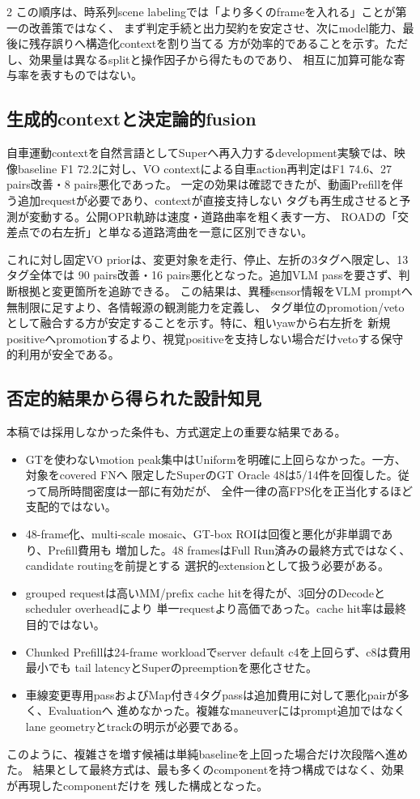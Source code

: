 \documentclass[9pt,a4paper]{extarticle}
\begin{document}
\begin{multicols}{2}
この順序は、時系列scene labelingでは「より多くのframeを入れる」ことが第一の改善策ではなく、
まず判定手続と出力契約を安定させ、次にmodel能力、最後に残存誤りへ構造化contextを割り当てる
方が効率的であることを示す。ただし、効果量は異なるsplitと操作因子から得たものであり、
相互に加算可能な寄与率を表すものではない。

\subsection{生成的contextと決定論的fusion}
自車運動contextを自然言語としてSuperへ再入力するdevelopment実験では、映像baseline
F1 72.2に対し、VO contextによる自車action再判定はF1 74.6、27 pairs改善・8 pairs悪化であった。
一定の効果は確認できたが、動画Prefillを伴う追加requestが必要であり、contextが直接支持しない
タグも再生成させると予測が変動する。公開OPR軌跡は速度・道路曲率を粗く表す一方、
ROADの「交差点での右左折」と単なる道路湾曲を一意に区別できない。

これに対し固定VO priorは、変更対象を走行、停止、左折の3タグへ限定し、13タグ全体では
90 pairs改善・16 pairs悪化となった。追加VLM passを要さず、判断根拠と変更箇所を追跡できる。
この結果は、異種sensor情報をVLM promptへ無制限に足すより、各情報源の観測能力を定義し、
タグ単位のpromotion/vetoとして融合する方が安定することを示す。特に、粗いyawから右左折を
新規positiveへpromotionするより、視覚positiveを支持しない場合だけvetoする保守的利用が安全である。

\subsection{否定的結果から得られた設計知見}
本稿では採用しなかった条件も、方式選定上の重要な結果である。
\begin{itemize}
  \item GTを使わないmotion peak集中はUniformを明確に上回らなかった。一方、対象をcovered FNへ
        限定したSuperのGT Oracle 48は5/14件を回復した。従って局所時間密度は一部に有効だが、
        全件一律の高FPS化を正当化するほど支配的ではない。
  \item 48-frame化、multi-scale mosaic、GT-box ROIは回復と悪化が非単調であり、Prefill費用も
        増加した。48 framesはFull Run済みの最終方式ではなく、candidate routingを前提とする
        選択的extensionとして扱う必要がある。
  \item grouped requestは高いMM/prefix cache hitを得たが、3回分のDecodeとscheduler overheadにより
        単一requestより高価であった。cache hit率は最終目的ではない。
  \item Chunked Prefillは24-frame workloadでserver default c4を上回らず、c8は費用最小でも
        tail latencyとSuperのpreemptionを悪化させた。
  \item 車線変更専用passおよびMap付き4タグpassは追加費用に対して悪化pairが多く、Evaluationへ
        進めなかった。複雑なmaneuverにはprompt追加ではなくlane geometryとtrackの明示が必要である。
\end{itemize}
このように、複雑さを増す候補は単純baselineを上回った場合だけ次段階へ進めた。
結果として最終方式は、最も多くのcomponentを持つ構成ではなく、効果が再現したcomponentだけを
残した構成となった。


\end{multicols}
\end{document}
